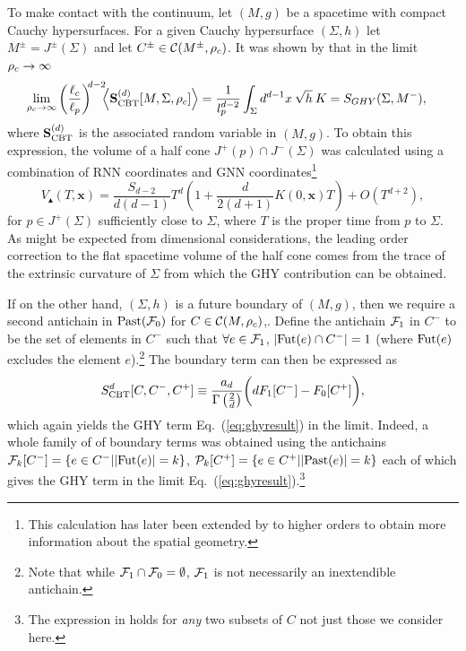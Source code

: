 To make
contact with the continuum, let $(M,g)$ be a spacetime with compact Cauchy hypersurfaces. For a given Cauchy
hypersurface $(\Sigma,h)$ let $M^\pm=J^\pm(\Sigma)$ and let $C^\pm \in \mathcal C(M^\pm,\rho_c)$.  It was shown by \cite{bdjs} that in
the limit $\rho_c \rightarrow \infty$ %
\begin{equation} 
\negs\negs \lim_{\rc\rightarrow \infty}\left (\frac{\lc}{\lp}\right)^{\! \! d-2}\negs \left\langle\textbf{S}^{
    (d)}_{\rm CBT}[M, \Sigma,\rc]\right\rangle= \frac{1}{l_p^{d-2}}\int_{\Sigma} d^{d-1}x\: \sqrt{h}\: K = {S}_{GHY}(\Sigma,
M^-), \label{eq:ghyresult} 
\end{equation}
where $\textbf{S}^{(d)}_{\rm CBT}$ is the associated random variable in $(M,g)$.  To obtain this expression, the volume  of a
half
cone $J^+(p) \cap J^-(\Sigma)$ was calculated using a combination of RNN coordinates 
and GNN coordinates\footnote{This calculation has later been extended by \cite{jubb} to higher orders to
  obtain more information about the spatial geometry.}
\begin{equation} 
V_\blacktriangle (T,\mathbf x)
=\frac{S_{d-2}}{d(d-1)}T^d\left (1+\frac{d}{2 (d+1)}K (0,\mathbf{x})T\right)
+O (T^{d+2}),   \label{eq:TopVolumeWithK} 
\end{equation}
for $p \in J^+(\Sigma)$  sufficiently close to $\Sigma$, where $T$ is the proper time from $p$ to $\Sigma$. 
As might be expected from dimensional considerations, the leading order correction to the flat spacetime volume of the
half cone comes  from the trace of the extrinsic curvature of $\Sigma$ from which the GHY contribution can be obtained.   
   

If on the other hand, $(\Sigma,h)$ is a future boundary of $(M,g)$, then we require a second
antichain in $\mathrm{Past}(\mathcal F_0)$  for $C \in \mathcal C(M,\rho_c)$,. Define the antichain $\mathcal F_1$ in $C^-$ to
be the set of elements in $C^-$ such that $\forall e \in \mathcal F_1$, $|\mathrm{Fut}(e) \cap C^-|=1$ (where $\mathrm{Fut}(e)$ excludes the
element $e$).\footnote{Note that while  $\mathcal F_1\cap \mathcal F_0=\emptyset$,  $\mathcal F_1$ is not necessarily an inextendible
  antichain.}  The boundary  term can then be expressed as 
\begin{equation} 
S_{\rm CBT}^d[C,C^-,C^+] \equiv \frac{a_d}{\Gamma\left(\frac{2}{d}\right)}\biggl( dF_{1}[C^-]-F_{0}[C^+]\biggr),  
\label{eq:cbttwo} 
\end{equation} 
which again yields the GHY term Eq.~(\ref{eq:ghyresult})  in the limit. Indeed, a whole  family of  of boundary terms was
obtained using the antichains $\mathcal F_k[C^-] = \{e \in C^-|  |\mathrm{Fut}(e)|=k\}$, $\mathcal P_k[C^+]= \{e \in C^+ |
|\mathrm{Past}(e)|=k\}$ each of which gives the GHY term in the limit Eq.~(\ref{eq:ghyresult}).\footnote{The expression in \cite{bdjs} holds for \emph{any} two subsets of $C$ not just those we
  consider here.}

